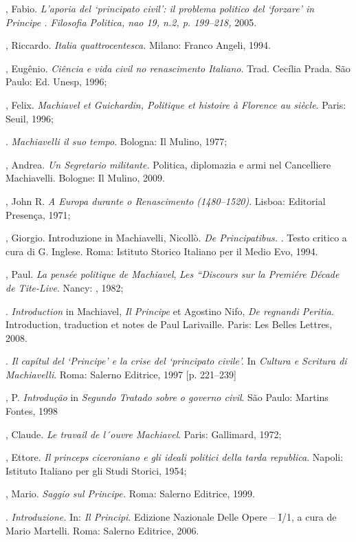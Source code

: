 \begin{bibliohedra}
, Fabio. \emph{L'aporia del `principato civil': il problema
politico del `forzare' in Principe . Filosofia Politica, nao 19, n.2,
p. 199--218,} 2005.

, Riccardo. \emph{Italia quattrocentesca.} Milano: Franco Angeli,
1994.

, Eugênio. \emph{Ciência e vida civil no renascimento Italiano}.
Trad. Cecília Prada. São Paulo: Ed. Unesp, 1996;

, Felix. \emph{Machiavel et Guichardin, Politique et histoire à
Florence au  siècle}. Paris: Seuil, 1996;

\titidem. \emph{Machiavelli il suo tempo}. Bologna: Il Mulino,
1977;

, Andrea. \emph{Un Segretario militante.} Politica, diplomazia e
armi nel Cancelliere Machiavelli. Bologne: Il Mulino, 2009.

, John R. \emph{A Europa durante o Renascimento (1480--1520)}.
Lisboa: Editorial Presença, 1971;

, Giorgio. Introduzione in Machiavelli, Nicollò. \emph{De
Principatibus.} . Testo critico a cura di G. Inglese. Roma: Istituto
Storico Italiano per il Medio Evo, 1994.

, Paul. \emph{La pensée politique de Machiavel}, \emph{Les
``Discours sur la Premiére Décade de Tite-Live}. Nancy: , 1982;

\titidem. \emph{Introduction} in Machiavel, \emph{Il Principe}
et Agostino Nifo, \emph{De regnandi Peritia}. Introduction, traduction
et notes de Paul Larivaille. Paris: Les Belles Lettres, 2008.

\titidem. \emph{Il capítul  del `Principe' e la crise del
`principato civile'.} In \emph{Cultura e Scritura di Machiavelli}. Roma:
Salerno Editrice, 1997 {[}p. 221--239{]}

, P. \emph{Introdução} in \emph{Segundo Tratado sobre o governo
civil}. São Paulo: Martins Fontes, 1998

, Claude. \emph{Le travail de l´ouvre Machiavel}. Paris:
Gallimard, 1972;

, Ettore. \emph{Il princeps ciceroniano e gli ideali politici
della tarda republica}. Napoli: Istituto Italiano per gli Studi Storici,
1954;

, Mario. \emph{Saggio sul Principe.} Roma: Salerno Editrice,
1999.

\titidem. \emph{Introduzione.} In: \emph{Il Principi}. Edizione
Nazionale Delle Opere -- I/1, a cura de Mario Martelli. Roma: Salerno
Editrice, 2006.


\end{bibliohedra}
